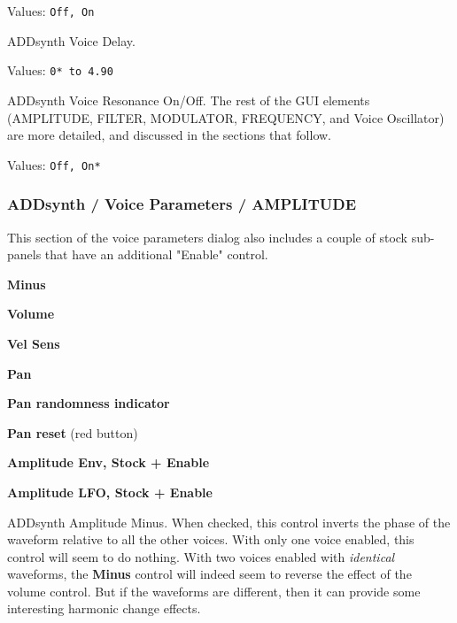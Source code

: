    Values: \texttt{Off, On}

   ADDsynth Voice Delay.

   Values: \texttt{0* to 4.90}

   ADDsynth Voice Resonance On/Off.
   The rest of the GUI elements
   (AMPLITUDE, FILTER, MODULATOR, FREQUENCY, and Voice Oscillator)
   are more detailed, and discussed in the sections that follow.

   Values: \texttt{Off, On*}

\subsubsection{ADDsynth / Voice Parameters / AMPLITUDE}
\label{subsubsec:addsynth_voice_parameters_amplitude}

   This section of the voice parameters dialog also includes a couple of
   stock sub-panels that have an additional "Enable" control.

   \begin{enumber}
      \item \textbf{Minus}
      \item \textbf{Volume}
      \item \textbf{Vel Sens}
      \item \textbf{Pan}
      \item \textbf{Pan randomness indicator}
      \item \textbf{Pan reset} (red button)
      \item \textbf{Amplitude Env, Stock + Enable}
      \item \textbf{Amplitude LFO, Stock + Enable}
   \end{enumber}

   \setcounter{ItemCounter}{0}      %

   ADDsynth Amplitude Minus.
   When checked, this control inverts the phase of the waveform relative to all
   the other voices.
   With only one voice enabled, this control will seem to do nothing.
   With two voices enabled with \textsl{identical} waveforms, the
   \textbf{Minus} control will indeed seem to reverse the effect of the volume
   control. But if the waveforms are different, then it can provide some
   interesting harmonic change effects.

